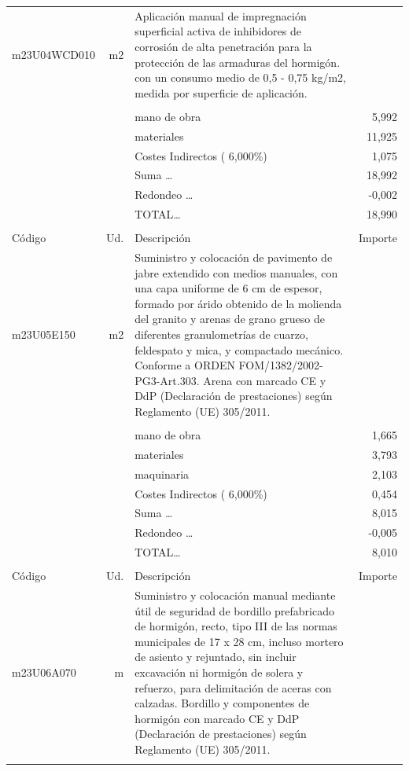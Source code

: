 \begin{supertabular}{l r p{60mm} r}
\hline%
m23U04WCD010&m2&Aplicación manual de impregnación superficial activa de inhibidores de corrosión de alta penetración para la protección de las armaduras del hormigón. con un consumo medio de 0,5 {-} 0,75 kg/m2, medida por superficie de aplicación.&\\%
&&&\\%
&&mano de obra&     5,992\\%
&&materiales&    11,925\\%
&&Costes Indirectos (     6,000\%)&     1,075\\%
&&Suma \ldots&    18,992\\%
&&Redondeo \ldots&    {-}0,002\\%
%
&&TOTAL\ldots&    18,990\\%
&&&\\%
Código&Ud.&Descripción&Importe\\%
\hline%
m23U05E150&m2&Suministro y colocación de pavimento de jabre extendido con medios manuales, con una capa uniforme de 6 cm de espesor, formado por árido obtenido de la molienda del granito y arenas de grano grueso de diferentes granulometrías de cuarzo, feldespato y mica, y compactado mecánico. Conforme a ORDEN FOM/1382/2002{-}PG3{-}Art.303. Arena con marcado CE y DdP (Declaración de prestaciones) según Reglamento (UE) 305/2011.&\\%
&&&\\%
&&mano de obra&     1,665\\%
&&materiales&     3,793\\%
&&maquinaria&     2,103\\%
&&Costes Indirectos (     6,000\%)&     0,454\\%
&&Suma \ldots&     8,015\\%
&&Redondeo \ldots&    {-}0,005\\%
%
&&TOTAL\ldots&     8,010\\%
&&&\\%
Código&Ud.&Descripción&Importe\\%
\hline%
m23U06A070&m&Suministro y colocación manual mediante útil de seguridad de bordillo prefabricado de hormigón, recto, tipo III de las normas municipales de 17 x 28 cm, incluso mortero de asiento y rejuntado, sin incluir excavación ni hormigón de solera y refuerzo, para delimitación de aceras con calzadas. Bordillo y componentes de hormigón con marcado CE y DdP (Declaración de prestaciones) según Reglamento (UE) 305/2011.&\\%
&&&\\%

\end{supertabular}
